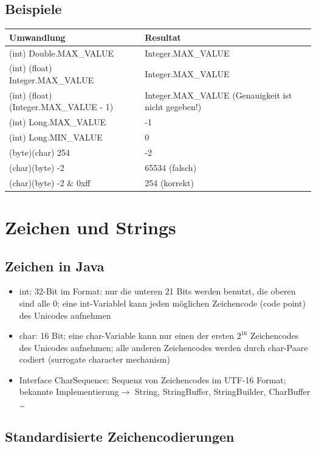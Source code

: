 \documentclass[a4paper,10pt]{article}
\newcommand{\Bold}[1]{\textbf{#1}} %
\newcommand{\ra}{\rightarrow}
\begin{document}
\subsection{Beispiele}
\begin{tabular}{|l|l|}
\hline
\Bold{Umwandlung}&\Bold{Resultat}\\\hline\hline

(int) Double.MAX\_VALUE & Integer.MAX\_VALUE \\\hline
(int) (float) Integer.MAX\_VALUE & Integer.MAX\_VALUE \\\hline
(int) (float) (Integer.MAX\_VALUE - 1) & Integer.MAX\_VALUE (Genauigkeit ist nicht gegeben!)\\\hline
(int) Long.MAX\_VALUE & -1\\\hline
(int) Long.MIN\_VALUE & 0 \\\hline

(byte)(char) 254 & -2 \\\hline
(char)(byte) -2 & 65534 (falsch) \\\hline
(char)(byte) -2 $\&$ 0xff & 254 (korrekt) \\\hline
\hline
\end{tabular}



\pagebreak
\section{Zeichen und Strings}
\subsection{Zeichen in Java}
\begin{itemize}
\item int: 32-Bit im Format: nur die unteren 21 Bits werden benutzt, die oberen sind alle 0; eine int-Variablel kann jeden m\"oglichen Zeichencode (code point) des Unicodes aufnehmen
\item char: 16 Bit; eine char-Variable kann nur einen der ersten $2^{16}$ Zeichencodes des Unicodes aufnehmen; alle anderen Zeichencodes werden durch char-Paare codiert (surrogate character mechanism)
\item Interface CharSequence: Sequenz von Zeichencodes im UTF-16 Format; bekannte Implementierung$\ra$ String, StringBuffer, StringBuilder, CharBuffer \ldots
\end{itemize}

\subsection{Standardisierte Zeichencodierungen}
\end{document}

